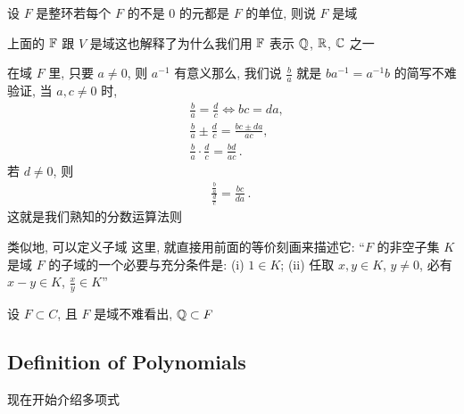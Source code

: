 \begin{definition}
    设 $F$ 是整环\period 若每个 $F$ 的不是 $0$ 的元都是 $F$ 的单位, 则说 $F$ 是域 \period
\end{definition}

\begin{example}
    上面的 $\mathbb{F}$ 跟 $V$ 是域\period 这也解释了为什么我们用 $\mathbb{F}$ 表示 $\mathbb{Q}$, $\mathbb{R}$, $\mathbb{C}$ 之一\period
\end{example}

\begin{remark}
    在域 $F$ 里, 只要 $a \neq 0$, 则 $a^{-1}$ 有意义\period 那么, 我们说 $\frac{b}{a}$ 就是 $ba^{-1} = a^{-1}b$ 的简写\period 不难验证, 当 $a,c \neq 0$ 时,
    \begin{align*}
         & \frac{b}{a} = \frac{d}{c} \iff bc = da,              \\
         & \frac{b}{a} \pm \frac{d}{c} = \frac{bc \pm da}{ac},  \\
         & \frac{b}{a} \cdot \frac{d}{c} = \frac{bd}{ac}\period
    \end{align*}
    若 $d \neq 0$, 则
    \begin{align*}
        \frac{\frac{b}{a}}{\frac{d}{c}} = \frac{bc}{da}\period
    \end{align*}
    这就是我们熟知的分数运算法则\period
\end{remark}

\begin{remark}
    类似地, 可以定义子域 \period 这里, 就直接用前面的等价刻画来描述它: ``$F$ 的非空子集 $K$ 是域 $F$ 的子域的一个必要与充分条件是: (i) $1 \in K$; (ii) 任取 $x,y \in K$, $y \neq 0$, 必有 $x-y \in K$, $\frac{x}{y} \in K$\period ''
\end{remark}

\begin{example}
    设 $F \subset C$, 且 $F$ 是域\period 不难看出, $\mathbb{Q} \subset F$\period
\end{example}

\subsection*{Definition of Polynomials}

现在开始介绍多项式\period

